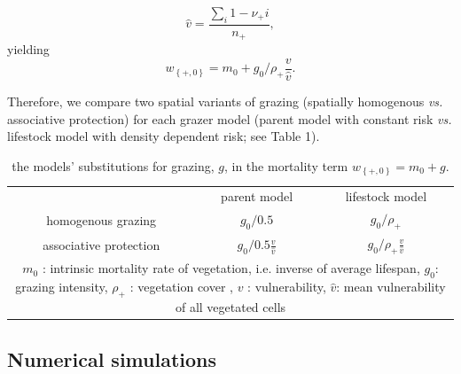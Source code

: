 \begin{equation}
\widehat{v} =  \frac{ \sum\limits_i{ 1 - {\nu_+i}}  } {n_+} ,
\label{eq:vul}
\end{equation}
yielding
\begin{equation}
	w_{ \left\{ +,0 \right\} }  = m_0 + g_0 / \rho_+ \frac{v}{\widehat{v}}.
\label{eq:}
\end{equation}

Therefore, we compare two spatial variants of grazing (spatially homogenous \textit{vs.} associative protection) for each grazer model (parent model with constant risk \textit{vs.} lifestock model with density dependent risk; see Table 1). 



\begin{table}[t!]
\label{tab:models}
\caption{the models' substitutions for grazing,  $g$, in the mortality term $w_{ \left\{ +,0 \right\} }  = m_0 + g$.  }
\centering
\begin{tabular}{ccc}

\toprule
 & parent model & lifestock model \\ \cmidrule(rl){2-2} \cmidrule(rl){3-3}
homogenous grazing &  $g_0/0.5$ & $g_0/\rho_+$\\
associative protection & $g_0/0.5 \frac{v}{\hat{v}}$  & $g_0/\rho_+ \frac{v}{\hat{v}}$ \\
	\bottomrule
\multicolumn{3}{p{9.5cm}}{\footnotesize $m_0$ : intrinsic mortality rate of vegetation, i.e. inverse of average lifespan, $g_0$: grazing intensity, $\rho_+$ : vegetation cover , $v$ : vulnerability, $\hat{v}$: mean vulnerability of all vegetated cells }
	\end{tabular}
\end{table}



\subsection{Numerical simulations}


